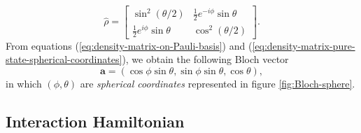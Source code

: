 \begin{equation}
	\hat{\rho} = \left[ \begin{matrix} \sin^2(\theta/2) & \frac{1}{2}e^{-i\phi}\sin\theta \\ \frac{1}{2}e^{i\phi}\sin\theta & \cos^2(\theta/2) \end{matrix} \right].
	\label{eq:density-matrix-pure-state-spherical-coordinates}
\end{equation}
From equations (\ref{eq:density-matrix-on-Pauli-basis}) and (\ref{eq:density-matrix-pure-state-spherical-coordinates}), we obtain the following Bloch vector
\begin{equation}
	\mathbf{a} = (\cos\phi \sin\theta, \sin\phi \sin\theta, \cos\theta),
\end{equation}
in which $ (\phi, \theta) $ are \textit{spherical coordinates} represented in figure \ref{fig:Bloch-sphere}.

%
\subsection{Interaction Hamiltonian}
\label{sec:interaction-Hamiltonian}

